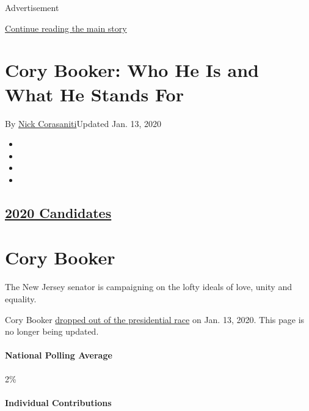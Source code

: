 Advertisement

\protect\hyperlink{after-top}{Continue reading the main story}

\hypertarget{cory-booker-who-he-is-and-what-he-stands-for}{%
\section{Cory Booker: Who He Is and What He Stands
For}\label{cory-booker-who-he-is-and-what-he-stands-for}}

By \href{https://www.nytimes.com/by/nick-corasaniti}{Nick
Corasaniti}Updated Jan. 13, 2020

\begin{itemize}
\item
\item
\item
\item
\end{itemize}

\hypertarget{2020-candidates}{%
\subsection{\texorpdfstring{\href{https://www.nytimes.com/interactive/2019/us/politics/2020-presidential-candidates.html}{2020
Candidates}}{2020 Candidates}}\label{2020-candidates}}

\hypertarget{cory-booker}{%
\section{Cory Booker}\label{cory-booker}}

The New Jersey senator is campaigning on the lofty ideals of love, unity
and equality.

Cory Booker
\href{https://www.nytimes.com/2020/01/13/us/politics/cory-booker-drops-out.html}{dropped
out of the presidential race} on Jan. 13, 2020. This page is no longer
being updated.

\hypertarget{national-polling-average}{%
\paragraph{National Polling Average}\label{national-polling-average}}

2\%

\hypertarget{individual-contributions}{%
\paragraph{Individual Contributions}\label{individual-contributions}}

